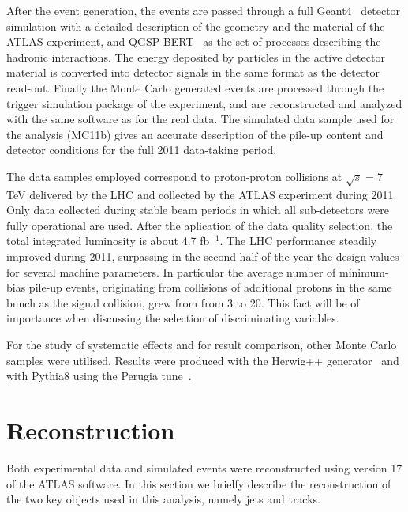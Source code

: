 After the event generation, the events are passed through a full {\sc Geant4}~\cite{GEANT4} detector simulation with a detailed description of the geometry and the material of the ATLAS experiment, and QGSP$\_$BERT~\cite{QGSP, BERT} as 
the set of processes describing the hadronic interactions. The energy deposited by particles in the active detector material is converted into detector signals in the same format as the detector read-out. Finally the Monte Carlo generated events are processed through the trigger simulation package of the experiment, and are reconstructed and analyzed with the same software as for the real data.
The simulated data sample used for the analysis (MC11b) gives an accurate description of the pile-up content and detector conditions for the full 2011 data-taking period. 

The data samples employed correspond to proton-proton collisions at $\sqrt{s}=7$ TeV delivered by the LHC and collected by the ATLAS experiment during 2011. Only data collected during stable beam periods in which all sub-detectors were fully operational are used.  After the aplication of the data quality selection, the total integrated luminosity is about  4.7 fb$^{-1}$.  The LHC performance steadily improved during 2011, surpassing in the second half of the year the design values for several machine parameters. In particular the average number of minimum-bias pile-up events, originating from collisions of additional protons in the same bunch as the signal collision, grew from from 3 to 20. This fact will be of importance when discussing the selection of discriminating variables.  

For the study of systematic effects and for result comparison, other Monte Carlo samples were utilised. Results were produced with the {\sc Herwig++} generator~\cite{Herwig} and with {\sc Pythia8} using the Perugia tune~\cite{Perugia}.


\section{Reconstruction}\label{sec:ObjSelection}

Both experimental data and simulated events were reconstructed using version 17 of the ATLAS software. In this section we brielfy describe the reconstruction of the two key objects used in this analysis, namely jets and tracks.


